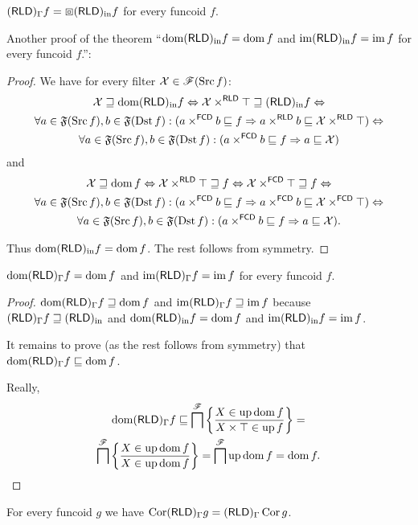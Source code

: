 \begin{conjecture}
$(\mathsf{RLD})_{\Gamma}f=\boxbox(\mathsf{RLD})_{\mathrm{in}} f$ for every funcoid $f$.
\end{conjecture}
Another proof of the theorem ``$\operatorname{dom}(\mathsf{RLD})_{\mathrm{in}} f=\operatorname{dom} f$ and $\operatorname{im}(\mathsf{RLD})_{\mathrm{in}} f=\operatorname{im} f$
for every funcoid $f$.'':
\begin{proof}
We have for every filter $\mathcal{X}\in\mathscr{F}(\operatorname{Src} f)$:
\begin{multline*}
\mathcal{X}\sqsupseteq\operatorname{dom}(\mathsf{RLD})_{\mathrm{in}} f\Leftrightarrow\mathcal{X}\times^{\mathsf{RLD}}\top\sqsupseteq(\mathsf{RLD})_{\mathrm{in}} f\Leftrightarrow\\
\forall a\in\mathfrak{F}(\operatorname{Src} f),b\in\mathfrak{F}(\operatorname{Dst} f):(a\times^{\mathsf{FCD}}b\sqsubseteq f\Rightarrow a\times^{\mathsf{RLD}}b\sqsubseteq\mathcal{X}\times^{\mathsf{RLD}}\top)\Leftrightarrow\\
\forall a\in\mathfrak{F}(\operatorname{Src} f),b\in\mathfrak{F}(\operatorname{Dst} f):(a\times^{\mathsf{FCD}}b\sqsubseteq f\Rightarrow a\sqsubseteq\mathcal{X})
\end{multline*}
and 
\begin{multline*}
\mathcal{X}\sqsupseteq\operatorname{dom} f\Leftrightarrow\mathcal{X}\times^{\mathsf{RLD}}\top\sqsupseteq f\Leftrightarrow\mathcal{X}\times^{\mathsf{FCD}}\top\sqsupseteq f\Leftrightarrow\\
\forall a\in\mathfrak{F}(\operatorname{Src} f),b\in\mathfrak{F}(\operatorname{Dst} f):(a\times^{\mathsf{FCD}}b\sqsubseteq f\Rightarrow a\times^{\mathsf{FCD}}b\sqsubseteq\mathcal{X}\times^{\mathsf{FCD}}\top)\Leftrightarrow\\
\forall a\in\mathfrak{F}(\operatorname{Src} f),b\in\mathfrak{F}(\operatorname{Dst} f):(a\times^{\mathsf{FCD}}b\sqsubseteq f\Rightarrow a\sqsubseteq\mathcal{X}).
\end{multline*}


Thus $\operatorname{dom}(\mathsf{RLD})_{\mathrm{in}} f=\operatorname{dom} f$. The rest follows from symmetry.\end{proof}
\begin{prop}
$\operatorname{dom}(\mathsf{RLD})_{\Gamma}f=\operatorname{dom} f$ and $\operatorname{im}(\mathsf{RLD})_{\Gamma}f=\operatorname{im} f$
for every funcoid $f$.\end{prop}
\begin{proof}
$\operatorname{dom}(\mathsf{RLD})_{\Gamma}f\sqsupseteq\operatorname{dom} f$ and $\operatorname{im}(\mathsf{RLD})_{\Gamma}f\sqsupseteq\operatorname{im} f$
because $(\mathsf{RLD})_{\Gamma}f\sqsupseteq(\mathsf{RLD})_{\mathrm{in}}$ and $\operatorname{dom}(\mathsf{RLD})_{\mathrm{in}} f=\operatorname{dom} f$
and $\operatorname{im}(\mathsf{RLD})_{\mathrm{in}} f=\operatorname{im} f$.

It remains to prove (as the rest follows from symmetry) that $\operatorname{dom}(\mathsf{RLD})_{\Gamma}f\sqsubseteq\operatorname{dom} f$.

Really, 
\begin{multline*}
\operatorname{dom}(\mathsf{RLD})_{\Gamma}f\sqsubseteq\bigsqcap^{\mathscr{F}}\left\{ \frac{X\in\operatorname{up}\operatorname{dom} f}{X\times\top\in\operatorname{up} f}\right\}=\\
\bigsqcap^{\mathscr{F}}\left\{ \frac{X\in\operatorname{up}\operatorname{dom} f}{X\in\operatorname{up}\operatorname{dom} f}\right\}=\bigsqcap^{\mathscr{F}}\operatorname{up}\operatorname{dom} f=\operatorname{dom} f.
\end{multline*}
\end{proof}
\begin{conjecture}
For every funcoid $g$ we have $\operatorname{Cor}(\mathsf{RLD})_{\Gamma}g=(\mathsf{RLD})_{\Gamma}\operatorname{Cor} g$.
\end{conjecture}

